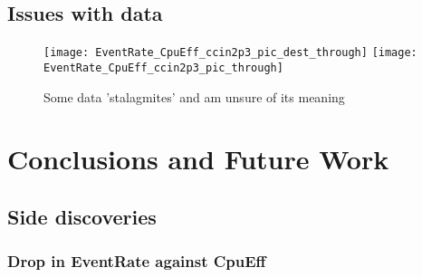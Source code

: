 \documentclass[]{scrartcl}
\begin{document}
\subsection{Issues with data}
\begin{figure}
	\caption{Some data 'stalagmites' and am unsure of its meaning}
    \centering
	\texttt{[image: EventRate\_CpuEff\_ccin2p3\_pic\_dest\_through]}
	\texttt{[image: EventRate\_CpuEff\_ccin2p3\_pic\_through]}
\end{figure}

\section{Conclusions and Future Work}
\subsection{Side discoveries}
\subsubsection{Drop in EventRate against CpuEff}
\end{document}
